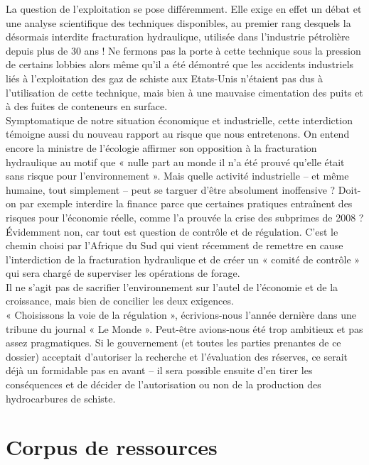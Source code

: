 \documentclass[8pt]{article}
\begin{document}
La question de l’exploitation se pose différemment. Elle exige en effet un débat et une analyse scientifique des techniques disponibles, au premier rang desquels la désormais interdite fracturation hydraulique, utilisée dans l’industrie pétrolière depuis plus de 30 ans ! Ne fermons pas la porte à cette technique sous la pression de certains lobbies alors même qu’il a été démontré que les accidents industriels liés à l’exploitation des gaz de schiste aux Etats-Unis n’étaient pas dus à l’utilisation de cette technique, mais bien à une mauvaise cimentation des puits et à des fuites de conteneurs en surface.\\

Symptomatique de notre situation économique et industrielle, cette interdiction témoigne aussi du nouveau rapport au risque que nous entretenons. On entend encore la ministre de l’écologie affirmer son opposition à la fracturation hydraulique au motif que « nulle part au monde il n’a été prouvé qu’elle était sans risque pour l’environnement ». Mais quelle activité industrielle – et même humaine, tout simplement – peut se targuer d’être absolument inoffensive ? Doit-on par exemple interdire la finance parce que certaines pratiques entraînent des risques pour l’économie réelle, comme l’a prouvée la crise des subprimes de 2008 ? Évidemment non, car tout est question de contrôle et de régulation. C’est le chemin choisi par l’Afrique du Sud qui vient récemment de remettre en cause l’interdiction de la fracturation hydraulique et de créer un « comité de contrôle » qui sera chargé de superviser les opérations de forage.\\

Il ne s’agit pas de sacrifier l’environnement sur l’autel de l’économie et de la croissance, mais bien de concilier les deux exigences. \\

« Choisissons la voie de la régulation », écrivions-nous l’année dernière dans une tribune du journal « Le Monde ». Peut-être avions-nous été trop ambitieux et pas assez pragmatiques. Si le gouvernement (et toutes les parties prenantes de ce dossier) acceptait d’autoriser la recherche et l’évaluation des réserves, ce serait déjà un formidable pas en avant – il sera possible ensuite d’en tirer les conséquences et de décider de l’autorisation ou non de la production des hydrocarbures de schiste.

\newpage
\section{Corpus de ressources}
\end{document}
